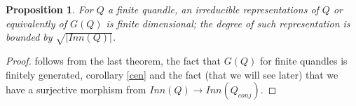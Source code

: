 \documentclass[12pt, reqno]{amsart}
\newtheorem{proposition}[theorem]{Proposition}
\newcommand{\C}{ {\mathbb C} }
\begin{document}

\begin{proposition}
For $Q$ a finite quandle, an irreducible representations of $Q$ or equivalently of $G(Q)$ is finite dimensional; the degree of such representation is bounded by $\sqrt{\vert Inn(Q) \vert }$. 
\end{proposition}
\begin{proof}
follows from the last theorem, the fact that $G(Q)$ for finite quandles is finitely generated, corollary \ref{cen} and the fact (that we will see later) that we have a surjective morphism from $Inn(Q)\to Inn(Q_{conj})$.
\end{proof}
\end{document}
